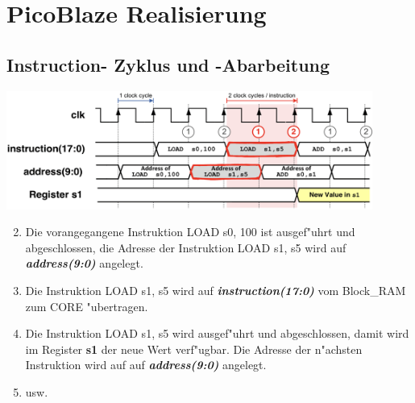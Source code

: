\section{PicoBlaze Realisierung}
\newcommand*\circled[1]{
    \tikz[baseline=(char.base)]{
        \node[shape=circle,draw,inner sep=0pt] (char) {#1\strut}
    }\kern-3pt
}

\let\oldlabelenumi=\labelenumi
\let\oldlabelenumii=\labelenumii
\subsection{Instruction- Zyklus und -Abarbeitung}
\includegraphics[width=12cm]{pics/7-Instruktion-zyklus}
\begin{enumerate}
	\setcounter{enumi}{1}
	\renewcommand{\labelenumi}{\circled{\oldlabelenumi}}
		\item Die vorangegangene Instruktion LOAD s0, 100 ist ausgef"uhrt und abgeschlossen, die Adresse der Instruktion \color{red} LOAD s1, s5 \color{black} wird auf \textit{\textbf{address(9:0)}} angelegt.
	\renewcommand{\labelenumi}{\oldlabelenumi}
	\color{red}
	\setcounter{enumi}{0}
	\renewcommand{\labelenumi}{\circled{\oldlabelenumi}}
		\item \color{black} Die Instruktion \color{red} LOAD s1, s5 \color{black} wird auf \textit{\textbf{instruction(17:0)}} vom Block\_RAM zum CORE "ubertragen.
	\renewcommand{\labelenumi}{\oldlabelenumi}
	\color{red}
	\renewcommand{\labelenumi}{\circled{\oldlabelenumi}}
		\item \color{black} Die Instruktion \color{red} LOAD s1, s5 \color{black} wird ausgef"uhrt und abgeschlossen, damit wird im Register \textbf{s1} der neue Wert verf"ugbar. Die Adresse der n"achsten Instruktion wird auf auf \textit{\textbf{address(9:0)}} angelegt.
	\renewcommand{\labelenumi}{\oldlabelenumi}
	\setcounter{enumi}{0}
	\renewcommand{\labelenumi}{\circled{\oldlabelenumi}}
		\item usw.
	\renewcommand{\labelenumi}{\oldlabelenumi}
\end{enumerate}

